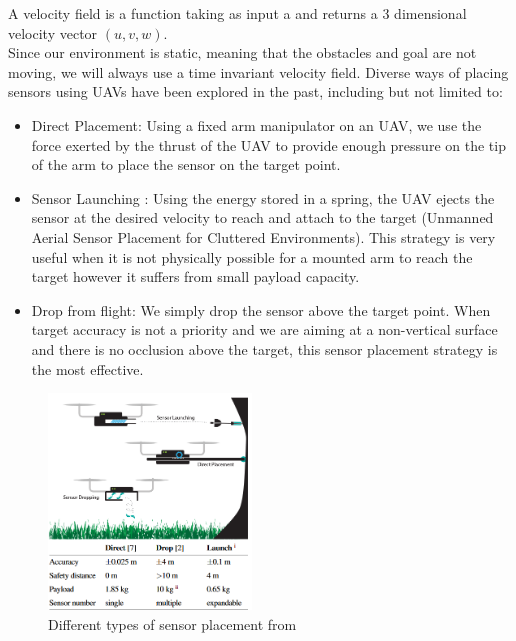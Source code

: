 A velocity field is a function taking as input  a   and returns a 3 dimensional  velocity vector $(u,v,w)$.\\
Since our environment is static, meaning that the obstacles and goal are not moving, we will always use a time invariant velocity field.
Diverse ways of placing sensors using UAVs have been explored in the past, including but not limited to: 
\begin{itemize}
    \item Direct Placement: Using a fixed arm manipulator on an UAV, we use the force exerted by the thrust of the UAV to provide enough pressure on the tip of the arm to place the sensor on the target point.
    \item Sensor Launching \cite{farinha2020unmanned}: Using the energy stored in a spring, the UAV ejects the sensor at the desired velocity to reach and attach to the target (Unmanned Aerial Sensor Placement for Cluttered Environments). This strategy is very useful when it is not physically possible for a mounted arm to reach the target however it suffers from small payload capacity.
    \item Drop from flight: We simply drop the sensor above the target point. When target accuracy is not a priority and we are aiming at a non-vertical surface and there is no occlusion above the target,  this sensor placement strategy is the most effective. 
\end{itemize}
\begin{figure}[h!]
    \centering
    \includegraphics[width=0.48\textwidth]{Images/threeway.png}
    \caption{Different types of sensor placement from \cite{farinha2020unmanned}}
    \label{fig:threeway}
\end{figure}
